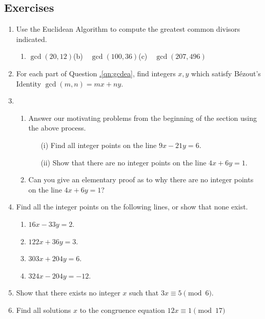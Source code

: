 \subsection*{Exercises}

\begin{enumerate}\renewcommand{\labelenumi}{\thesubsection.\theenumi}
  \item\label{qn:gcdea} Use the Euclidean Algorithm to compute the greatest common divisors indicated.
  \begin{enumerate}
    \item $\gcd(20,12)$\qquad (b)\ \ $\gcd(100,36)$\qquad (c)\ \ $\gcd(207,496)$
  \end{enumerate} 
  
  \item For each part of Question \hyperref[qn:gcdea]{\thesubsection.\ref*{qn:gcdea}}, find integers $x,y$ which satisfy Bézout's Identity $\gcd(m,n)=mx+ny$.
  
  
  \item\begin{enumerate}
    \item Answer our motivating problems from the beginning of the section using the above process.
  		\begin{enumerate}
    		\item[(i)] Find all integer points on the line $9x-21y=6$.
    		\item[(ii)] Show that there are no integer points on the line $4x+6y=1$.
  		\end{enumerate}
  	\item Can you give an elementary proof as to why there are no integer points on the line $4x+6y=1$?
  \end{enumerate} 
  
	\item Find all the integer points on the following lines, or show that none exist.
    \begin{enumerate}
      \item $16x-33y=2$.
      \item $122x+36y=3$.
      \item $303x+204y=6$.
      \item $324x-204y=-12$.
    \end{enumerate}
  
  \item Show that there exists no integer $x$ such that $3x\equiv 5\pmod 6$.
  
  \item Find all solutions $x$ to the congruence equation $12x\equiv 1\pmod{17}$
    

\end{enumerate}
